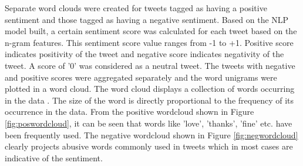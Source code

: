 \documentclass[9pt,twocolumn,twoside]{../../styles/osajnl}
\begin{document}
\begin{itemize}
    Separate word clouds were created for tweets tagged as having a positive sentiment and those tagged as having a negative sentiment. Based on the NLP model built, a certain sentiment score was calculated for each tweet based on the n-gram features. This sentiment score value ranges from -1 to +1. Positive score indicates positivity of the tweet and negative score indicates negativity of the tweet. A score of '0' was considered as a neutral tweet. The tweets with negative and positive scores were aggregated separately and the word unigrams were plotted in a word cloud. The word cloud displays a collection of words occurring in the data \cite{www-wordcloud}. The size of the word is directly proportional to the frequency of its occurrence in the data. From the positive wordcloud shown in Figure \ref{fig:poswordcloud}, it can be seen that words like 'love', 'thanks', 'fine' etc. have been frequently used. The negative wordcloud shown in Figure \ref{fig:negwordcloud} clearly projects abusive words commonly used in tweets which in most cases are indicative of the sentiment.     
\end{itemize}
\end{document}
